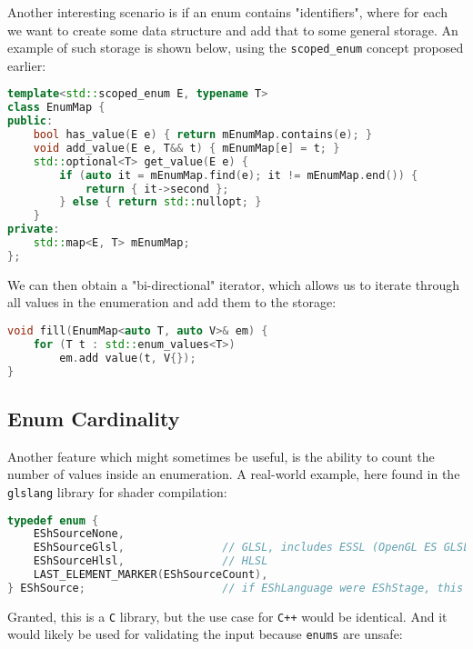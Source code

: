\documentclass[
  format=manuscript,
  screen=true,
  review=false,
  nonacm=true,
  timestamp=true,
  balance=false]{acmart}
\begin{document}
Another interesting scenario is if an enum contains "identifiers", where for each we
want to create some data structure and add that to some general storage. An example
of such storage is shown below, using the \texttt{scoped\_enum} concept proposed
earlier:\vspace{2mm}

\begin{lstlisting}[language=Cpp]
template<std::scoped_enum E, typename T>
class EnumMap {
public:
    bool has_value(E e) { return mEnumMap.contains(e); }
    void add_value(E e, T&& t) { mEnumMap[e] = t; }
    std::optional<T> get_value(E e) {
        if (auto it = mEnumMap.find(e); it != mEnumMap.end()) {
            return { it->second };
        } else { return std::nullopt; }
    }
private:
    std::map<E, T> mEnumMap;
};
\end{lstlisting}

We can then obtain a "bi-directional" iterator, which allows us to iterate through
all values in the enumeration and add them to the storage:\vspace{2mm}

\begin{lstlisting}[language=Cpp]
void fill(EnumMap<auto T, auto V>& em) {
    for (T t : std::enum_values<T>)
        em.add value(t, V{});
}
\end{lstlisting}


\subsection{Enum Cardinality}

Another feature which might sometimes be useful, is the ability to count the number
of values inside an enumeration. A real-world example, here found in the
\texttt{glslang} library for shader compilation:\vspace{2mm}

\begin{lstlisting}[language=Cpp]
typedef enum {
    EShSourceNone,
    EShSourceGlsl,               // GLSL, includes ESSL (OpenGL ES GLSL)
    EShSourceHlsl,               // HLSL
    LAST_ELEMENT_MARKER(EShSourceCount),
} EShSource;                     // if EShLanguage were EShStage, this could be EShLanguage instead
\end{lstlisting}

Granted, this is a \texttt{C} library, but the use case for \texttt{C++} would be
identical. And it would likely be used for validating the input because \texttt{enums}
are unsafe:\vspace{2mm}
\end{document}
